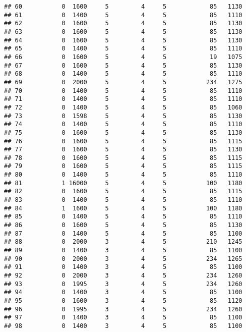 \documentclass[]{article}
\begin{document}
\begin{verbatim}
## 60           0  1600     5         4     5            85   1130
## 61           0  1400     5         4     5            85   1110
## 62           0  1600     5         4     5            85   1130
## 63           0  1600     5         4     5            85   1130
## 64           0  1600     5         4     5            85   1130
## 65           0  1400     5         4     5            85   1110
## 66           0  1600     5         4     5            19   1075
## 67           0  1600     5         4     5            85   1130
## 68           0  1400     5         4     5            85   1110
## 69           0  2000     5         4     5           234   1275
## 70           0  1400     5         4     5            85   1110
## 71           0  1400     5         4     5            85   1110
## 72           0  1400     5         4     5            85   1060
## 73           0  1598     5         4     5            85   1130
## 74           0  1400     5         4     5            85   1110
## 75           0  1600     5         4     5            85   1130
## 76           0  1600     5         4     5            85   1115
## 77           0  1600     5         4     5            85   1130
## 78           0  1600     5         4     5            85   1115
## 79           0  1600     5         4     5            85   1115
## 80           0  1400     5         4     5            85   1110
## 81           1 16000     5         4     5           100   1180
## 82           0  1600     5         4     5            85   1115
## 83           0  1400     5         4     5            85   1110
## 84           1  1600     5         4     5           100   1180
## 85           0  1400     5         4     5            85   1110
## 86           0  1600     5         4     5            85   1130
## 87           0  1400     5         4     5            85   1100
## 88           0  2000     3         4     5           210   1245
## 89           0  1400     3         4     5            85   1100
## 90           0  2000     3         4     5           234   1265
## 91           0  1400     3         4     5            85   1100
## 92           0  2000     3         4     5           234   1260
## 93           0  1995     3         4     5           234   1260
## 94           0  1400     3         4     5            85   1100
## 95           0  1600     3         4     5            85   1120
## 96           0  1995     3         4     5           234   1260
## 97           0  1400     3         4     5            85   1100
## 98           0  1400     3         4     5            85   1100

\end{verbatim}
\end{document}
